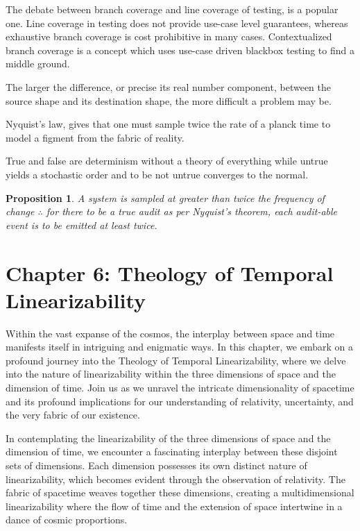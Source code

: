 \documentclass[ebook,12pt,oneside,openany]{memoir}
\newtheorem*{proposition}{Proposition} %
\begin{document}
\indent The debate between branch coverage and line coverage of testing, is a popular one. Line coverage in testing does not provide use-case level guarantees, whereas exhaustive branch coverage is cost prohibitive in many cases. Contextualized branch coverage is a concept which uses use-case driven blackbox testing to find a middle ground.

\indent The larger the difference, or precise its real number component, between the source shape and its destination shape, the more difficult a problem may be.

\indent Nyquist’s law, gives that one must sample twice the rate of a planck time to model a figment from the fabric of reality.

\indent True and false are determinism without a theory of everything while untrue yields a stochastic order and to be not untrue converges to the normal.

\indent \begin{proposition}
A system is sampled at greater than twice the frequency of change $\therefore$ for there to be a true audit as per Nyquist's theorem, each audit-able event is to be emitted at least twice.
\end{proposition}
\chapter*{Chapter 6: Theology of Temporal Linearizability}


\indent \indent Within the vast expanse of the cosmos, the interplay between space and time manifests itself in intriguing and enigmatic ways. In this chapter, we embark on a profound journey into the Theology of Temporal Linearizability, where we delve into the nature of linearizability within the three dimensions of space and the dimension of time. Join us as we unravel the intricate dimensionality of spacetime and its profound implications for our understanding of relativity, uncertainty, and the very fabric of our existence.

\indent In contemplating the linearizability of the three dimensions of space and the dimension of time, we encounter a fascinating interplay between these disjoint sets of dimensions. Each dimension possesses its own distinct nature of linearizability, which becomes evident through the observation of relativity. The fabric of spacetime weaves together these dimensions, creating a multidimensional linearizability where the flow of time and the extension of space intertwine in a dance of cosmic proportions.
\end{document}
